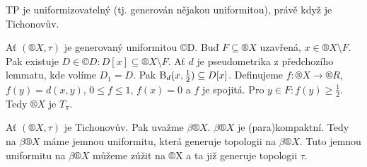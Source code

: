 \documentclass[12pt]{article}                   %
\begin{document}
    \begin{veta}[Uniformizovatelnost TP]
        TP je uniformizovatelný (tj. generován nějakou uniformitou), právě když je Tichonovův.

        \begin{dukazin}
            Ať $(®X, \tau)$ je generovaný uniformitou ©D. Buď $F \subseteq ®X$ uzavřená, $x \in ®X \setminus F$. Pak existuje $D \in ©D: D[x] \subseteq ®X \setminus F$. Ať $d$ je pseudometrika z předchozího lemmatu, kde volíme $D_1 = D$. Pak $\operatorname{B}_d(x, \frac{1}{2}) \subseteq D[x]$. Definujeme $f: ®X \rightarrow ®R$, $f(y) = d(x, y)$, $0 ≤ f ≤ 1$, $f(x) = 0$ a $f$ je spojitá. Pro $y \in F: f(y) ≥ \frac{1}{2}$. Tedy $®X$ je $T_\pi$.

            Ať $(®X, \tau)$ je Tichonovův. Pak uvažme $\beta®X$. $\beta®X$ je (para)kompaktní. Tedy na $\beta®X$ máme jemnou uniformitu, která generuje topologii na $\beta®X$. Tuto jemnou uniformitu na $\beta®X$ můžeme zúžit na ®X a ta již generuje topologii $\tau$.
        \end{dukazin}
    \end{veta}
\end{document}
